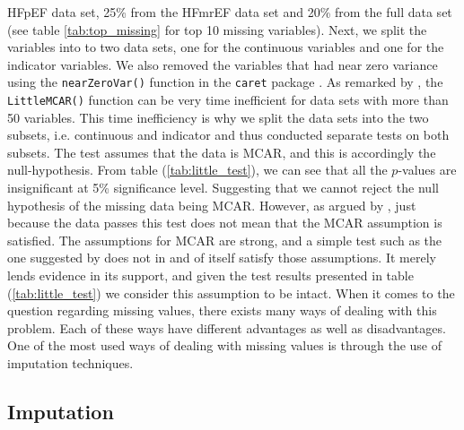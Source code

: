 \documentclass[../thesis.tex]{subfiles}
\begin{document}
 

\noindent HFpEF data set, 25\% from the HFmrEF data set and 20\% from the full data set (see table \ref{tab:top_missing} for top 10 missing variables). Next, we split the variables into to two data sets, one for the continuous variables and one for the indicator variables. We also removed the variables that had near zero variance using the \texttt{nearZeroVar()} function in the \texttt{caret} package \citep{kuhncaret}. As remarked by \cite{BaylorEdPsych}, the \texttt{LittleMCAR()} function can be very time inefficient for data sets with more than 50 variables. This time inefficiency is why we split the data sets into the two subsets, i.e. continuous and indicator and thus conducted separate tests on both subsets. The test assumes that the data is MCAR, and this is accordingly the null-hypothesis. From table (\ref{tab:little_test}), we can see that all the $p$-values are insignificant at 5\% significance level. Suggesting that we cannot reject the null hypothesis of the missing data  
\noindent being MCAR. However, as argued by \cite{allison1999missing}, just because the data passes this test does not mean that the MCAR assumption is satisfied. The assumptions for MCAR are strong, and a simple test such as the one suggested by \cite{little1988test} does not in and of itself satisfy those assumptions. It merely lends evidence in its support, and given the test results presented in table (\ref{tab:little_test}) we consider this assumption to be intact. When it comes to the question regarding missing values, there exists many ways of dealing with this problem. Each of these ways have different advantages as well as disadvantages. One of the most used ways of dealing with missing values is through the use of imputation techniques. 

\subsection{Imputation}
\label{subsec:impu}
\end{document}
